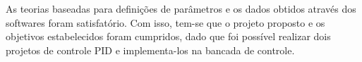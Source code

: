 \documentclass[12 pt,conference]{IEEEtran}
\begin{document}
     As teorias baseadas para definições de parâmetros e os dados obtidos através dos softwares foram satisfatório. Com isso, tem-se que o projeto proposto e os objetivos estabelecidos foram cumpridos, dado que foi possível realizar dois projetos de controle PID e implementa-los na bancada de controle.
    
     
\addtolength{\textheight}{-12cm} 


\end{document}
